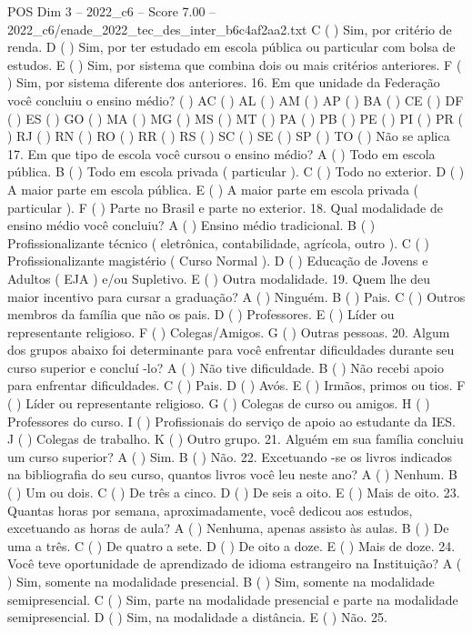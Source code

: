 \begin{textsample}{POS Dim 3 – 2022\_c6 – Score 7.00 – 2022\_c6/enade\_2022\_tec\_des\_inter\_b6c4af2aa2.txt}
C ( ) Sim, por critério de renda.
D ( ) Sim, por ter estudado em escola pública ou particular com bolsa de estudos.
E ( ) Sim, por sistema que combina dois ou mais critérios anteriores.
F ( ) Sim, por sistema diferente dos anteriores. 16.
Em que unidade da Federação você concluiu o ensino médio? ( ) AC ( ) AL ( ) AM ( ) AP ( ) BA ( ) CE ( ) DF ( ) ES ( ) GO ( ) MA ( ) MG ( ) MS ( ) MT ( ) PA ( ) PB ( ) PE ( ) PI ( ) PR ( ) RJ ( ) RN ( ) RO ( ) RR ( ) RS ( ) SC ( ) SE ( ) SP ( ) TO ( ) Não se aplica 17.
Em que tipo de escola você cursou o ensino médio?
A ( ) Todo em escola pública.
B ( ) Todo em escola privada ( particular ).
C ( ) Todo no exterior.
D ( ) A maior parte em escola pública.
E ( ) A maior parte em escola privada ( particular ).
F ( ) Parte no Brasil e parte no exterior. 18.
Qual modalidade de ensino médio você concluiu?
A ( ) Ensino médio tradicional.
B ( ) Profissionalizante técnico ( eletrônica, contabilidade, agrícola, outro ).
C ( ) Profissionalizante magistério ( Curso Normal ).
D ( ) Educação de Jovens e Adultos ( EJA ) e/ou Supletivo.
E ( ) Outra modalidade. 19.
Quem lhe deu maior incentivo para cursar a graduação?
A ( ) Ninguém.
B ( ) Pais.
C ( ) Outros membros da família que não os pais.
D ( ) Professores.
E ( ) Líder ou representante religioso.
F ( ) Colegas/Amigos.
G ( ) Outras pessoas. 20.
Algum dos grupos abaixo foi determinante para você enfrentar dificuldades durante seu curso superior e concluí -lo?
A ( ) Não tive dificuldade.
B ( ) Não recebi apoio para enfrentar dificuldades.
C ( ) Pais.
D ( ) Avós.
E ( ) Irmãos, primos ou tios.
F ( ) Líder ou representante religioso.
G ( ) Colegas de curso ou amigos.
H ( ) Professores do curso.
I ( ) Profissionais do serviço de apoio ao estudante da IES.
J ( ) Colegas de trabalho.
K ( ) Outro grupo. 21.
Alguém em sua família concluiu um curso superior?
A ( ) Sim.
B ( ) Não. 22.
Excetuando -se os livros indicados na bibliografia do seu curso, quantos livros você leu neste ano?
A ( ) Nenhum.
B ( ) Um ou dois.
C ( ) De três a cinco.
D ( ) De seis a oito.
E ( ) Mais de oito. 23.
Quantas horas por semana, aproximadamente, você dedicou aos estudos, excetuando as horas de aula?
A ( ) Nenhuma, apenas assisto às aulas.
B ( ) De uma a três.
C ( ) De quatro a sete.
D ( ) De oito a doze.
E ( ) Mais de doze. 24.
Você teve oportunidade de aprendizado de idioma estrangeiro na Instituição?
A ( ) Sim, somente na modalidade presencial.
B ( ) Sim, somente na modalidade semipresencial.
C ( ) Sim, parte na modalidade presencial e parte na modalidade semipresencial.
D ( ) Sim, na modalidade a distância.
E ( ) Não. 25.

\end{textsample}
